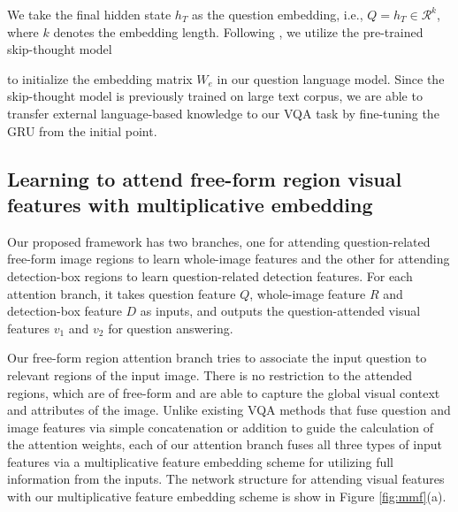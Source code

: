 \documentclass[letterpaper]{article}
\begin{document}
We take the final hidden state $h_T$ as the question embedding, i.e., $Q = h_T \in \mathcal{R}^{k} $, where $k$ denotes the embedding length. Following \cite{li2016visual,kim2016hadamard}, we utilize the pre-trained skip-thought model {\cite{kiros2015skip} to initialize the embedding matrix $W_e$ in our question language model. Since the skip-thought model is previously trained on large text corpus, we are able to transfer external language-based knowledge to our VQA task by fine-tuning the GRU from the initial point.


\subsection{Learning to attend free-form region visual features with multiplicative embedding}\label{32}

Our proposed framework has two branches, one for attending question-related free-form image regions to learn whole-image features and the other for attending detection-box regions to learn question-related detection features. For each attention branch, it takes question feature $Q$, whole-image feature $R$ and detection-box feature $D$ as inputs, and outputs the question-attended visual features $v_1$ and $v_2$ for question answering.

Our free-form region attention branch tries to associate the input question to relevant regions of the input image. There is no restriction to the attended regions, which are of free-form and are able to capture the global visual context and attributes of the image. Unlike existing VQA methods that fuse question and image features via simple concatenation \cite{shih2016look} or addition \cite{lu2016hierarchical} to guide the calculation of the attention weights, each of our attention branch fuses all three types of input features via a multiplicative feature embedding scheme for  utilizing full information from the inputs. The network structure for attending visual features with our multiplicative feature embedding scheme is show in Figure \ref{fig:mmf}(a).


}
\end{document}

